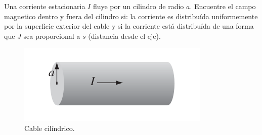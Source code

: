 \begin{mdframed}[style=warning]
	\begin{ejercicio}
		Una corriente estacionaria $I$ fluye por un cilindro de radio $a$. Encuentre el campo magnetico dentro y fuera del cilindro si: la corriente es distribuída uniformemente por la superficie exterior del cable y si la corriente está distribuída de una forma que $J$ sea proporcional a $s$ (distancia desde el eje).
		\begin{figure}[H]
			\centering
			\includegraphics[scale=0.5]{./img/p5.png}
			\caption{Cable cilíndrico.}
			\label{DF}	
		\end{figure}
	\end{ejercicio}
\end{mdframed}





























